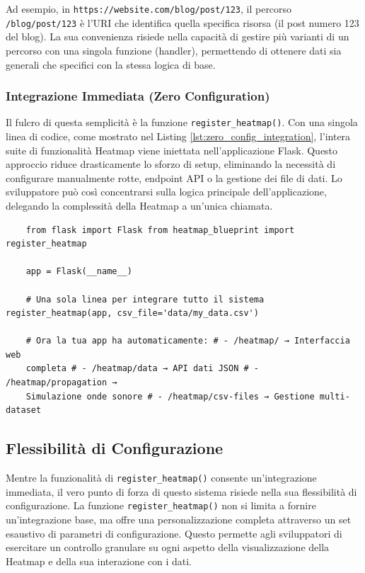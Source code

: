Ad esempio, in \texttt{https://website.com/blog/post/123}, il percorso \texttt{/blog/post/123}
è l'URI che identifica quella specifica risorsa (il post numero 123 del blog). La
sua convenienza risiede nella capacità di gestire più varianti di un percorso con
una singola funzione (handler), permettendo di ottenere dati sia generali che
specifici con la stessa logica di base.

\subsubsection{Integrazione Immediata (Zero Configuration)}
Il fulcro di questa semplicità è la funzione \texttt{register\_heatmap()}. Con
una singola linea di codice, come mostrato nel Listing \ref{lst:zero_config_integration},
l'intera suite di funzionalità Heatmap viene iniettata nell'applicazione Flask. Questo
approccio riduce drasticamente lo sforzo di setup, eliminando la necessità di
configurare manualmente rotte, endpoint API o la gestione dei file di dati. Lo
sviluppatore può così concentrarsi sulla logica principale dell'applicazione, delegando
la complessità della Heatmap a un'unica chiamata.

\begin{listing}
  [H]
  \caption{Integrazione immediata con \texttt{register\_heatmap()}}
  \label{lst:zero_config_integration}
  \begin{verbatim}
    from flask import Flask from heatmap_blueprint import register_heatmap

    app = Flask(__name__)

    # Una sola linea per integrare tutto il sistema register_heatmap(app, csv_file='data/my_data.csv')

    # Ora la tua app ha automaticamente: # - /heatmap/ → Interfaccia web
    completa # - /heatmap/data → API dati JSON # - /heatmap/propagation →
    Simulazione onde sonore # - /heatmap/csv-files → Gestione multi-dataset
  \end{verbatim}
\end{listing}

\subsection{Flessibilità di Configurazione}
Mentre la funzionalità  di \texttt{register\_heatmap()}
consente un'integrazione immediata, il vero punto di forza di questo sistema risiede
nella sua flessibilità di configurazione. La funzione \texttt{register\_heatmap()}
non si limita a fornire un'integrazione base, ma offre una personalizzazione
completa attraverso un set esaustivo di parametri di configurazione. Questo permette
agli sviluppatori di esercitare un controllo granulare su ogni aspetto della visualizzazione
della Heatmap e della sua interazione con i dati.

